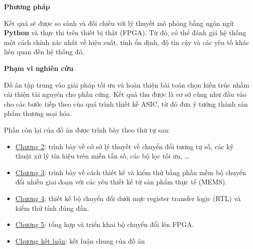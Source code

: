 \noindent \textbf{Phương pháp}

Kết quả sẽ được so sánh và đối chiếu với lý thuyết  mô phỏng bằng ngôn ngữ \textbf{Python} và thực thi trên thiết bị thật (FPGA). Từ đó, có thể đánh giá hệ thống một cách chính xác nhất về hiệu suất, tính ổn định, độ tin cậy và các yếu tố khác liên quan đến hệ thống đó.

\noindent \textbf{Phạm vi nghiên cứu}

Đồ án tập trung vào giải pháp tối ưu và hoàn thiện bài toán chọn kiến trúc nhằm cải thiện tài nguyên cho phần cứng. Kết quả thu được là cơ sở cũng như đầu vào cho các bước tiếp theo của quá trình thiết kế ASIC, từ đó đưa ý tưởng thành sản phẩm thương mại hóa.

\noindent Phần còn lại của đồ án được trình bày theo thứ tự sau:
\begin{itemize}
    \item \hyperref[chuong2]{Chương 2}: trình bày về cở sở lý thuyết về chuyển đổi tương tự số, các kỹ thuật xử lý tín hiệu trên miền tần số, các bộ lọc tối ưu, \ldots
    \item \hyperref[chuong3]{Chương 3}: trình bày về cách thiết kế và kiểm thử bằng phần mềm bộ chuyển đổi nhiều giai đoạn với các yêu thiết kế từ sản phẩm thực tế (MEMS).
    \item \hyperref[chuong4]{Chương 4}: thiết kế bộ chuyển đổi dưới mực register transfer logic (RTL) và kiểm thử tính đúng đắn.
    \item \hyperref[chuong5]{Chương 5}: tổng hợp và triển khai bộ chuyển đổi lên FPGA.
    \item \hyperref[ketluan]{Chương kết luận}: kết luận chung của đồ án
\end{itemize}
\newpage